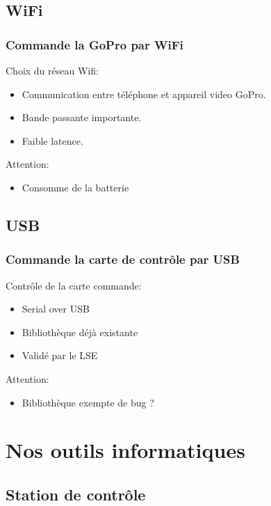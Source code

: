 \documentclass[transparent]{beamer}
\begin{document}
\subsection{WiFi}

\begin{frame}
\frametitle{Commande la GoPro par WiFi}
	\begin{block}{Choix du réseau Wifi:}
			\begin{itemize}
				\item Communication entre téléphone et appareil video GoPro.
				\item Bande passante importante.
				\item Faible latence.
			\end{itemize}
	\end{block}
	\begin{block}{Attention:}
			\begin{itemize}
				\item Consomme de la batterie
			\end{itemize}
	\end{block}
\end{frame}

\subsection{USB}

\begin{frame}
\frametitle{Commande la carte de contrôle par USB}
	\begin{block}{Contrôle de la carte commande:}
			\begin{itemize}
				\item Serial over USB
				\item Bibliothèque déjà existante
				\item Validé par le LSE
			\end{itemize}
	\end{block}
	\begin{block}{Attention:}
			\begin{itemize}
				\item Bibliothèque exempte de bug ?
			\end{itemize}
	\end{block}
\end{frame}
\section{Nos outils informatiques}
\subsection{Station de contrôle}
\end{document}
